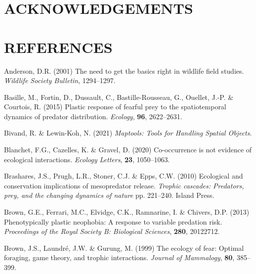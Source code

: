\documentclass[]{elsarticle} %
\begin{document}
\newpage

\hypertarget{acknowledgements}{%
\section*{ACKNOWLEDGEMENTS}\label{acknowledgements}}

\newpage

\hypertarget{references}{%
\section*{REFERENCES}\label{references}}

\hypertarget{refs}{}
\leavevmode\hypertarget{ref-anderson2001need}{}%
Anderson, D.R. (2001) The need to get the basics right in wildlife field studies. \emph{Wildlife Society Bulletin}, 1294--1297.

\leavevmode\hypertarget{ref-basille2015plastic}{}%
Basille, M., Fortin, D., Dussault, C., Bastille-Rousseau, G., Ouellet, J.-P. \& Courtois, R. (2015) Plastic response of fearful prey to the spatiotemporal dynamics of predator distribution. \emph{Ecology}, \textbf{96}, 2622--2631.

\leavevmode\hypertarget{ref-maptools}{}%
Bivand, R. \& Lewin-Koh, N. (2021) \emph{Maptools: Tools for Handling Spatial Objects}.

\leavevmode\hypertarget{ref-guillaume2020co}{}%
Blanchet, F.G., Cazelles, K. \& Gravel, D. (2020) Co-occurrence is not evidence of ecological interactions. \emph{Ecology Letters}, \textbf{23}, 1050--1063.

\leavevmode\hypertarget{ref-brashares2010ecological}{}%
Brashares, J.S., Prugh, L.R., Stoner, C.J. \& Epps, C.W. (2010) Ecological and conservation implications of mesopredator release. \emph{Trophic cascades: Predators, prey, and the changing dynamics of nature} pp. 221--240. Island Press.

\leavevmode\hypertarget{ref-brown2013phenotypically}{}%
Brown, G.E., Ferrari, M.C., Elvidge, C.K., Ramnarine, I. \& Chivers, D.P. (2013) Phenotypically plastic neophobia: A response to variable predation risk. \emph{Proceedings of the Royal Society B: Biological Sciences}, \textbf{280}, 20122712.

\leavevmode\hypertarget{ref-brown1999ecology}{}%
Brown, J.S., Laundré, J.W. \& Gurung, M. (1999) The ecology of fear: Optimal foraging, game theory, and trophic interactions. \emph{Journal of Mammalogy}, \textbf{80}, 385--399.
\end{document}
